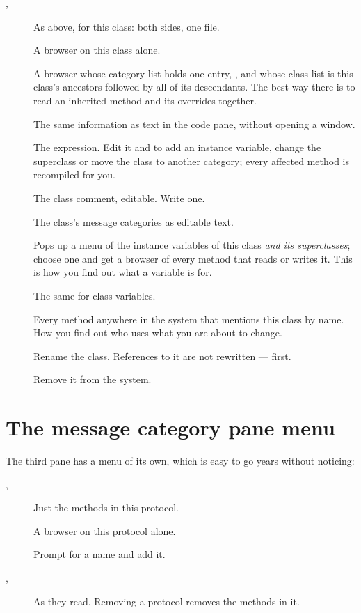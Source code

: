 \begin{description}
\item[, ] As above, for this class: both sides,
  one file.
\item[] A browser on this class alone.
\item[] A browser whose category list holds one entry,
  , and whose class list is this class's ancestors followed
  by all of its descendants. The best way there is to read an inherited method
  and its overrides together.
\medskip
\item[] The same information as text in the code pane, without
  opening a window.
\item[] The  expression. Edit it and
   to add an instance variable, change the superclass or move the
  class to another category; every affected method is recompiled for you.
\item[] The class comment, editable. Write one.
\item[] The class's message categories as editable text.
\medskip
\item[] Pops up a menu of the instance variables of this
  class \emph{and its superclasses}; choose one and get a browser of every
  method that reads or writes it. This is how you find out what a variable is
  for.
\item[] The same for class variables.
\item[] Every method anywhere in the system that mentions this
  class by name. How you find out who uses what you are about to change.
\medskip
\item[] Rename the class. References to it are not rewritten ---
   first.
\item[] Remove it from the system.
\end{description}

\section{The message category pane menu}

The third pane has a menu of its own, which is easy to go years without
noticing:

\begin{description}
\item[, ] Just the methods in this protocol.
\item[] A browser on this protocol alone.
\item[] Prompt for a name and add it.
\item[, ] As they read. Removing a protocol removes
  the methods in it.
\end{description}

